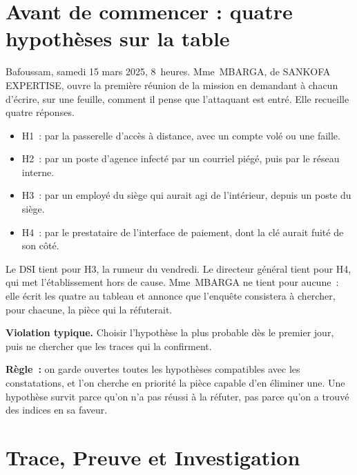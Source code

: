\section*{Avant de commencer : quatre hypothèses sur la table}

Bafoussam, samedi 15 mars 2025, 8~heures. Mme~MBARGA, de SANKOFA EXPERTISE,
ouvre la première réunion de la mission en demandant à chacun d'écrire, sur
une feuille, comment il pense que l'attaquant est entré. Elle recueille
quatre réponses.

\begin{itemize}
    \item H1~: par la passerelle d'accès à distance, avec un compte volé ou
          une faille.
    \item H2~: par un poste d'agence infecté par un courriel piégé, puis par
          le réseau interne.
    \item H3~: par un employé du siège qui aurait agi de l'intérieur,
          depuis un poste du siège.
    \item H4~: par le prestataire de l'interface de paiement, dont la clé
          aurait fuité de son côté.
\end{itemize}

Le DSI tient pour H3, la rumeur du vendredi. Le directeur général tient pour
H4, qui met l'établissement hors de cause. Mme~MBARGA ne tient pour aucune~:
elle écrit les quatre au tableau et annonce que l'enquête consistera à
chercher, pour chacune, la pièce qui la réfuterait.

\begin{boxalert}
\textbf{Violation typique.} Choisir l'hypothèse la plus probable dès le
premier jour, puis ne chercher que les traces qui la confirment.

\smallskip
\textbf{Règle~:} on garde ouvertes toutes les hypothèses compatibles avec les
constatations, et l'on cherche en priorité la pièce capable d'en éliminer
une. Une hypothèse survit parce qu'on n'a pas réussi à la réfuter, pas parce
qu'on a trouvé des indices en sa faveur.
\end{boxalert}

\separateur

\section{Trace, Preuve et Investigation}
\label{sec:c01-definitions}

